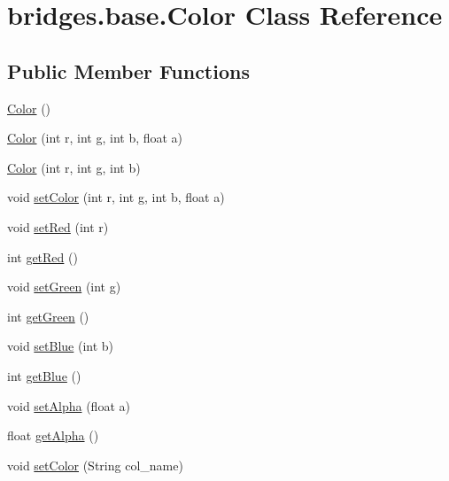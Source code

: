 \hypertarget{classbridges_1_1base_1_1_color}{}\section{bridges.\+base.\+Color Class Reference}
\label{classbridges_1_1base_1_1_color}
\subsection*{Public Member Functions}
\begin{DoxyCompactItemize}
\item 
\hyperlink{classbridges_1_1base_1_1_color_ab6d71ac2ee1430fb2db2fbe34e692de8}{Color} ()
\item 
\hyperlink{classbridges_1_1base_1_1_color_a15f56590ca3c9cc161c7bfa47060ad21}{Color} (int r, int g, int b, float a)
\item 
\hyperlink{classbridges_1_1base_1_1_color_a5fab564fa4eec8bece64f847ebd42948}{Color} (int r, int g, int b)
\item 
void \hyperlink{classbridges_1_1base_1_1_color_a5559b1c7eb4c3901526b1012029b528f}{set\+Color} (int r, int g, int b, float a)
\item 
void \hyperlink{classbridges_1_1base_1_1_color_a1d78967703924b709e76def5b2b3ee9a}{set\+Red} (int r)
\item 
int \hyperlink{classbridges_1_1base_1_1_color_af1a30dc925b35d6bfe609f8838651025}{get\+Red} ()
\item 
void \hyperlink{classbridges_1_1base_1_1_color_a415a28133ade4e216c02ecdfc8a32a1d}{set\+Green} (int g)
\item 
int \hyperlink{classbridges_1_1base_1_1_color_a8f3fdd23cf785704faa2e3701e25978f}{get\+Green} ()
\item 
void \hyperlink{classbridges_1_1base_1_1_color_a0e04156b1573cf8002c4d9cb69825657}{set\+Blue} (int b)
\item 
int \hyperlink{classbridges_1_1base_1_1_color_ad4b82e1eb9ff59857d2868edd8d4ce65}{get\+Blue} ()
\item 
void \hyperlink{classbridges_1_1base_1_1_color_afab07ce64efa1fa5797795670b0effb6}{set\+Alpha} (float a)
\item 
float \hyperlink{classbridges_1_1base_1_1_color_a7c4247e31ecd8fcc61ef208d5deefe68}{get\+Alpha} ()
\item 
void \hyperlink{classbridges_1_1base_1_1_color_a54dcd31227bde0f5d0a4f5d3b5a24ed2}{set\+Color} (String col\+\_\+name)
\end{DoxyCompactItemize}


